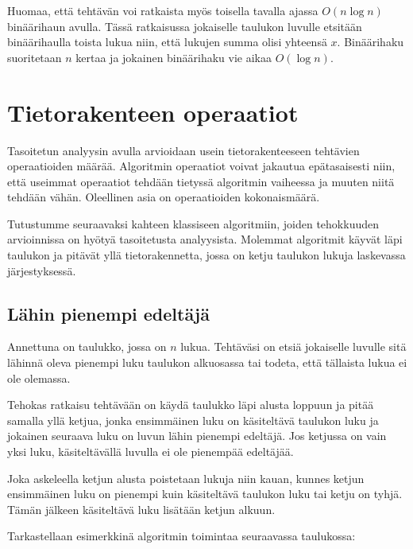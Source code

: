 Huomaa, että tehtävän voi ratkaista myös 
toisella tavalla ajassa
$O(n \log n)$ binäärihaun avulla.
Tässä ratkaisussa jokaiselle taulukon luvulle
etsitään binäärihaulla toista lukua niin,
että lukujen summa olisi yhteensä $x$.
Binäärihaku suoritetaan $n$ kertaa ja
jokainen binäärihaku vie aikaa $O(\log n)$.

\section{Tietorakenteen operaatiot}

Tasoitetun analyysin avulla arvioidaan usein
tietorakenteeseen tehtävien operaatioiden määrää.
Algoritmin operaatiot voivat jakautua epätasaisesti
niin, että useimmat operaatiot tehdään tietyssä
algoritmin vaiheessa ja muuten niitä tehdään vähän.
Oleellinen asia on operaatioiden kokonaismäärä.

Tutustumme seuraavaksi kahteen klassiseen algoritmiin,
joiden tehokkuuden arvioinnissa on hyötyä
tasoitetusta analyysista.
Molemmat algoritmit käyvät läpi taulukon ja
pitävät yllä tietorakennetta, jossa on ketju
taulukon lukuja laskevassa järjestyksessä.

\subsection{Lähin pienempi edeltäjä}

\begin{task}
Annettuna on taulukko, jossa on $n$ lukua.
Tehtäväsi on etsiä jokaiselle luvulle
sitä lähinnä oleva pienempi luku
taulukon alkuosassa
tai todeta, että tällaista lukua ei ole olemassa.
\end{task}

Tehokas ratkaisu tehtävään on käydä
taulukko läpi alusta loppuun ja pitää samalla yllä ketjua,
jonka ensimmäinen luku on käsiteltävä taulukon luku
ja jokainen seuraava luku on luvun lähin
pienempi edeltäjä.
Jos ketjussa on vain yksi luku,
käsiteltävällä luvulla ei ole pienempää edeltäjää.

Joka askeleella ketjun alusta poistetaan lukuja
niin kauan, kunnes ketjun ensimmäinen luku on 
pienempi kuin käsiteltävä taulukon luku tai ketju on tyhjä.
Tämän jälkeen käsiteltävä luku lisätään ketjun alkuun.

Tarkastellaan esimerkkinä algoritmin toimintaa
seuraavassa taulukossa:

